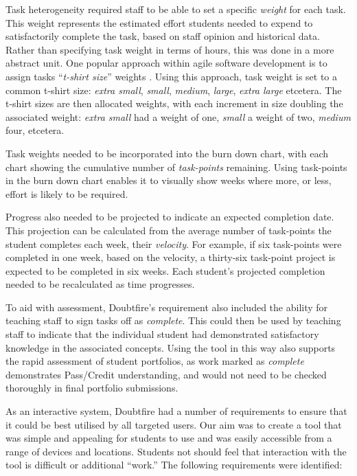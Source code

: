 Task heterogeneity required staff to be able to set a specific \emph{weight} for each task. This weight represents the estimated effort students needed to expend to satisfactorily complete the task, based on staff opinion and historical data. Rather than specifying task weight in terms of hours, this was done in a more abstract unit. One popular approach within agile software development is to assign tasks ``\emph{t-shirt size}'' weights \cite{Peixoto:2010}. Using this approach, task weight is set to a common t-shirt size: \emph{extra small}, \emph{small}, \emph{medium}, \emph{large}, \emph{extra large} etcetera. The t-shirt sizes are then allocated weights, with each increment in size doubling the associated weight: \emph{extra small} had a weight of one, \emph{small} a weight of two, \emph{medium} four, etcetera.

Task weights needed to be incorporated into the burn down chart, with each chart showing the cumulative number of \emph{task-points} remaining. Using task-points in the burn down chart enables it to visually show weeks where more, or less, effort is likely to be required.

Progress also needed to be projected to indicate an expected completion date. This projection can be calculated from the average number of task-points the student completes each week, their \emph{velocity}.  For example, if six task-points were completed in one week, based on the velocity, a thirty-six task-point project is expected to be completed in six weeks. Each student's projected completion needed to be recalculated as time progresses. 

To aid with assessment, Doubtfire's requirement also included the ability for teaching staff to sign tasks off as \emph{complete}. This could then be used by teaching staff to indicate that the individual student had demonstrated satisfactory knowledge in the associated concepts. Using the tool in this way also supports the rapid assessment of student portfolios, as work marked as \emph{complete} demonstrates Pass/Credit understanding, and would not need to be checked thoroughly in final portfolio submissions. 

As an interactive system, Doubtfire had a number of requirements to ensure that it could be best utilised by all targeted users. Our aim was to create a tool that was simple and appealing for students to use and was easily accessible from a range of devices and locations. Students not should feel that interaction with the tool is difficult or additional ``work.'' The following requirements were identified:


